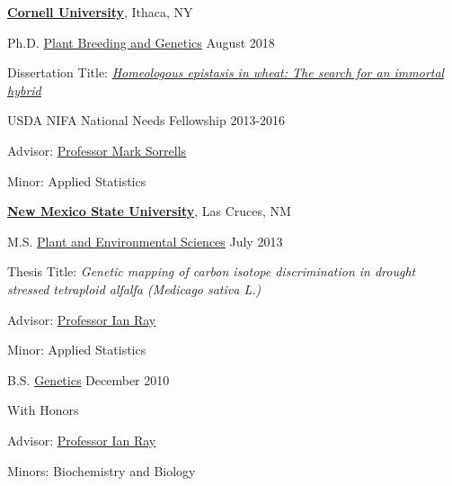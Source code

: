 \documentclass[10pt]{article}
\newcommand{\blankline}{\quad\pagebreak[3]}
\newcommand{\halfblankline}{\quad\vspace{-0.5\baselineskip}\pagebreak[3]}
\begin{document}
\href{https://www.cornell.edu/}{\textbf{Cornell University}},
Ithaca, NY
\begin{outerlist}

\item[] Ph.D.
        \href{https://plbrgen.cals.cornell.edu/}
             {Plant Breeding and Genetics} \hfill August 2018
        \begin{innerlist}
        \item Dissertation Title: \href{https://ecommons.cornell.edu/handle/1813/59754}{\emph{Homeologous epistasis in wheat: The search for an immortal hybrid}}%
        \item USDA NIFA National Needs Fellowship 2013-2016
         \item Advisor:
              \href{https://plbrgen.cals.cornell.edu/people/mark-sorrells}
                   {Professor Mark Sorrells}
        \item Minor: Applied Statistics
        \end{innerlist}
        \halfblankline
\end{outerlist}

\blankline

\href{https://www.nmsu.edu/}{\textbf{New Mexico State University}},
Las Cruces, NM
\begin{outerlist}

\item[] M.S.
        \href{https://www.nmsu.edu/}
             {Plant and Environmental Sciences} \hfill July 2013
        \begin{innerlist}
        \item Thesis Title: \emph{Genetic mapping of carbon isotope discrimination in drought stressed tetraploid alfalfa (\emph{Medicago sativa} L.)}
        \item Advisor:
              \href{http://aces.nmsu.edu/academics/pes/ian-ray.html}
                   {Professor Ian Ray}
        \item Minor: Applied Statistics
        \end{innerlist}

\item[] B.S.
        \href{http://aces.nmsu.edu/academics/pes/genetics-degree.html}
             {Genetics} \hfill December 2010
        \begin{innerlist}
        \item With Honors
        \item Advisor:
              \href{http://aces.nmsu.edu/academics/pes/ian-ray.html}
                   {Professor Ian Ray}
        \item Minors: Biochemistry and Biology
        \end{innerlist}

\end{outerlist}
\end{document}
